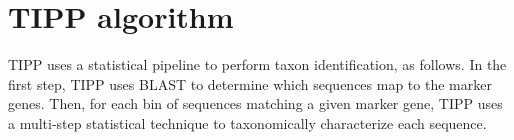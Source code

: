



\section{TIPP algorithm}\label{tipp:algorithm}
TIPP uses a statistical pipeline to 
perform taxon identification, as follows.  
In the first step, TIPP uses BLAST \cite{Altschul1990} to 
determine which sequences map to the marker
genes. 
Then, for each bin of sequences matching a given
marker gene, 
TIPP uses a multi-step statistical technique
to taxonomically characterize each sequence.

